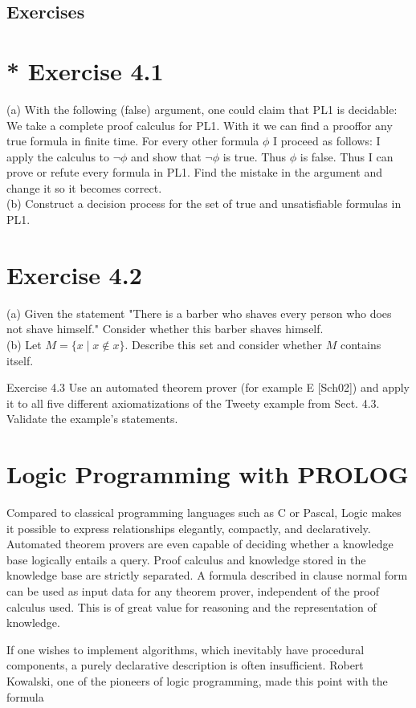 \documentclass[10pt]{article}
\begin{document}
\subsection*{Exercises}
\section*{* Exercise 4.1}
(a) With the following (false) argument, one could claim that PL1 is decidable: We take a complete proof calculus for PL1. With it we can find a prooffor any true formula in finite time. For every other formula $\phi$ I proceed as follows: I apply the calculus to $\neg \phi$ and show that $\neg \phi$ is true. Thus $\phi$ is false. Thus I can prove or refute every formula in PL1. Find the mistake in the argument and change it so it becomes correct.\\
(b) Construct a decision process for the set of true and unsatisfiable formulas in PL1.

\section*{Exercise 4.2}
(a) Given the statement "There is a barber who shaves every person who does not shave himself." Consider whether this barber shaves himself.\\
(b) Let $M=\{x \mid x \notin x\}$. Describe this set and consider whether $M$ contains itself.

Exercise 4.3 Use an automated theorem prover (for example E [Sch02]) and apply it to all five different axiomatizations of the Tweety example from Sect. 4.3. Validate the example's statements.

\section*{Logic Programming with PROLOG}
Compared to classical programming languages such as C or Pascal, Logic makes it possible to express relationships elegantly, compactly, and declaratively. Automated theorem provers are even capable of deciding whether a knowledge base logically entails a query. Proof calculus and knowledge stored in the knowledge base are strictly separated. A formula described in clause normal form can be used as input data for any theorem prover, independent of the proof calculus used. This is of great value for reasoning and the representation of knowledge.

If one wishes to implement algorithms, which inevitably have procedural components, a purely declarative description is often insufficient. Robert Kowalski, one of the pioneers of logic programming, made this point with the formula
\end{document}
